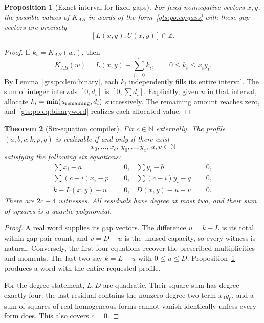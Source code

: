 \documentclass[11pt,letterpaper]{article}
\newtheorem{theorem}{Theorem}[section]
\newtheorem{proposition}[theorem]{Proposition}
\theoremstyle{definition}
\theoremstyle{remark}
\newcommand{\Z}{\mathbb Z}
\newcommand{\N}{\mathbb N}
\begin{document}
\begin{proposition}[Exact interval for fixed gaps]\label{gts:po:prop:gapinterval}
For fixed nonnegative vectors $x,y$, the possible values of $K_{AB}$ in words of the form~\eqref{gts:po:eq:gaps} with these gap vectors are precisely
\[
 [L(x,y),U(x,y)]\cap\Z.
\]
\end{proposition}
\begin{proof}
If $k_i=K_{AB}(w_i)$, then
\[
 K_{AB}(w)=L(x,y)+\sum_{i=0}^c k_i,
 \qquad 0\le k_i\le x_i y_i.
\]
By Lemma~\ref{gts:po:lem:binary}, each $k_i$ independently fills its entire interval. The sum of integer intervals $[0,d_i]$ is $[0,\sum d_i]$. Explicitly, given $u$ in that interval, allocate $k_i=\min(u_{\rm remaining},d_i)$ successively. The remaining amount reaches zero, and~\eqref{gts:po:eq:binaryword} realizes each allocated value.
\end{proof}

\begin{theorem}[Six-equation compiler]\label{gts:po:thm:gapcompiler}
Fix $c\in\N$ externally. The profile $(a,b,c;k,p,q)$ is realizable if and only if there exist
\[
 x_0,\ldots,x_c,\ y_0,\ldots,y_c,\ u,v\in\N
\]
satisfying the following six equations:
\begin{align}
 \sum x_i-a&=0,& \sum y_i-b&=0,\label{gts:po:eq:gapcert1}\\
 \sum(c-i)x_i-p&=0,& \sum(c-i)y_i-q&=0,\label{gts:po:eq:gapcert2}\\
 k-L(x,y)-u&=0,& D(x,y)-u-v&=0.\label{gts:po:eq:gapcert3}
\end{align}
There are $2c+4$ witnesses. All residuals have degree at most two, and their sum of squares is a quartic polynomial.
\end{theorem}
\begin{proof}
A real word supplies its gap vectors. The difference $u=k-L$ is its total within-gap pair count, and $v=D-u$ is the unused capacity, so every witness is natural. Conversely, the first four equations recover the prescribed multiplicities and moments. The last two say $k=L+u$ with $0\le u\le D$. Proposition~\ref{gts:po:prop:gapinterval} produces a word with the entire requested profile.

For the degree statement, $L,D$ are quadratic. Their square-sum has degree exactly four: the last residual contains the nonzero degree-two term $x_0y_0$, and a sum of squares of real homogeneous forms cannot vanish identically unless every form does. This also covers $c=0$.
\end{proof}
\end{document}
